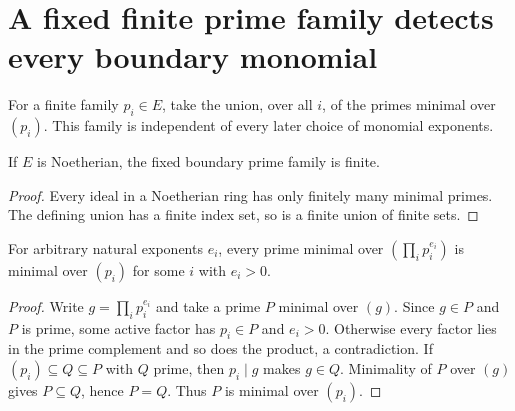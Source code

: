 \section{A fixed finite prime family detects every boundary monomial}

\begin{definition}\label{def:boundary-minimal-primes}
\leanok
For a finite family $p_i\in E$, take the union, over all $i$, of the
primes minimal over $(p_i)$. This family is independent of every later
choice of monomial exponents.
\end{definition}

\begin{lemma}\label{lem:finite-boundary-minimal-primes}
\leanok
{}
If $E$ is Noetherian, the fixed boundary prime family is finite.
\end{lemma}
\begin{proof}
Every ideal in a Noetherian ring has only finitely many minimal primes.
The defining union has a finite index set, so is a finite union of
finite sets.
\end{proof}

\begin{lemma}\label{lem:monomial-minimal-primes-boundary}
\leanok
{}
For arbitrary natural exponents $e_i$, every prime minimal over
$(\prod_i p_i^{e_i})$ is minimal over $(p_i)$ for some $i$ with $e_i>0$.
\end{lemma}
\begin{proof}
Write $g=\prod_i p_i^{e_i}$ and take a prime $P$ minimal over $(g)$.
Since $g\in P$ and $P$ is prime, some active factor has $p_i\in P$
and $e_i>0$. Otherwise every factor lies in the prime complement and
so does the product, a contradiction. If $(p_i)\subseteq Q\subseteq P$
with $Q$ prime, then $p_i\mid g$ makes $g\in Q$. Minimality of $P$ over
$(g)$ gives $P\subseteq Q$, hence $P=Q$. Thus $P$ is minimal over $(p_i)$.
\end{proof}

